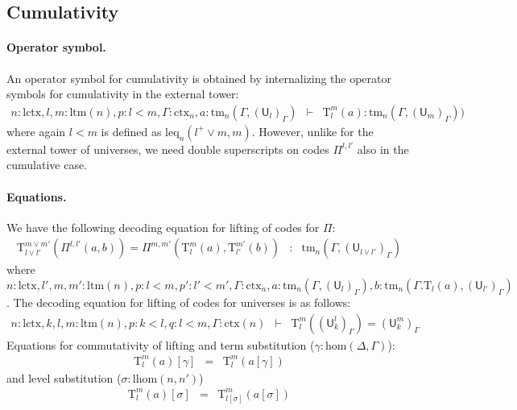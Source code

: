\documentclass[11pt,a4paper]{article}
\theoremstyle{plain}
\theoremstyle{definition}
\newcommand{\UU}{\mathsf{U}}
\def\lhom{\mathrm{lhom}}
\def\UU{\mathsf{U}}
\newcommand{\N}{\mathsf{N}}
\def\sub{\mathrm{hom}}
\def\lctx{\mathrm{lctx}}
\def\ltm{\mathrm{ltm}}
\def\leq{\mathrm{leq}}
\newcommand{\ctx}{\mathrm{ctx}}
\newcommand{\tm}{\mathrm{tm}}
\def\U{\mathsf{U}}
\newcommand{\Ta}{\mathrm{T}}
\begin{document}
\subsection{Cumulativity}
\paragraph{Operator symbol.}
An operator symbol for cumulativity is obtained by internalizing the operator symbols for cumulativity in the external tower:
\begin{eqnarray*}
n : \lctx, l,m : \ltm(n), p : l < m, \Gamma : \ctx_n, a : \tm_n(\Gamma,(\U_{l})_\Gamma) &\vdash& {\Ta^m_{l}}(a) : \tm_n(\Gamma,(\U_{m})_\Gamma))
\end{eqnarray*}
where again $l < m$ is defined as $\leq_n(l^+ \vee m, m)$. However, unlike for the external tower of universes, we need double superscripts on codes $\Pi^{l,l'}$ also in the cumulative case.

\paragraph{Equations.}
We have the following decoding equation for lifting of codes for $\Pi$:
\begin{eqnarray*}
\Ta^{m \vee m'}_{l \vee l'}(\Pi^{l,l'}(a,b)) = \Pi^{m,m'}(\Ta^m_l(a),\Ta^{m'}_{l'}(b)) &:& \tm_n(\Gamma,(\UU_{l \vee l'})_\Gamma)
\end{eqnarray*}
where $n: \lctx,l',m,m' : \ltm(n), p: l < m, p': l' < m', \Gamma : \ctx_n, a : \tm_n(\Gamma,(\UU_l)_\Gamma), b : \tm_n(\Gamma.\Ta_l(a),(\UU_{l'})_\Gamma)$.
The decoding equation for lifting of codes for universes is as follows:
\begin{eqnarray*}
n : \lctx, k, l, m : \ltm(n), p : k < l, q : l < m, \Gamma : \ctx(n) &\vdash& \Ta^m_l((\UU^l_k)_\Gamma) = (\UU^m_k)_\Gamma
\end{eqnarray*}
Equations for commutativity of lifting and term substitution ($\gamma : \sub(\Delta,\Gamma)$):
\begin{eqnarray*}
\Ta^m_l(a) [ \gamma ] &=& \Ta^m_l(a[ \gamma ] )
\end{eqnarray*}
and level substitution ($\sigma : \lhom(n,n')$)
\begin{eqnarray*}
\Ta^m_l(a) [ \sigma ] &=& \Ta^m_{l[\sigma]}(a[ \sigma ] )
\end{eqnarray*}
\end{document}
